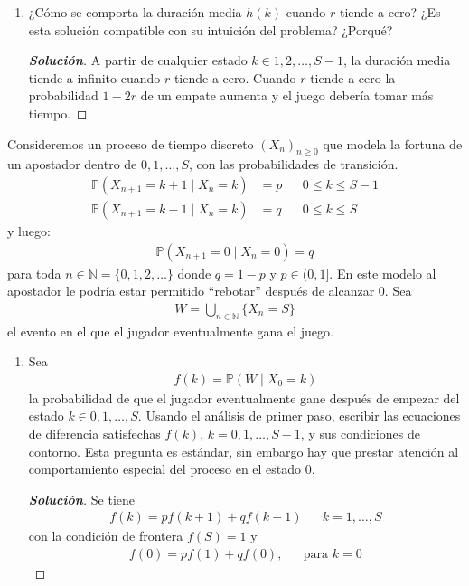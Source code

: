 \documentclass[12pt, letterpaper]{article}
\newcommand{\p}{\mathbb{P}}
\newenvironment{manualtheorem}[1]{%
  \renewcommand\themanualtheoreminner{#1}%
  \manualtheoreminner
}{\endmanualtheoreminner}
\newenvironment{solucion}
  {\renewcommand\qedsymbol{$\square$}\begin{proof}[\textbf{Solución}]}
  {\end{proof}}
\begin{document}
\begin{manualtheorem}{3.1}
\begin{enumerate}
        \item ¿Cómo se comporta la duración media $h(k)$ cuando $r$ tiende a cero? ¿Es esta solución compatible con su intuición del problema? ¿Porqué?
        \begin{solucion}
            A partir de cualquier estado $k \in {1, 2,\dots,S - 1}$, la duración media tiende a infinito cuando $r$ tiende a cero.
            Cuando $r$ tiende a cero la probabilidad $1 - 2r$ de un empate aumenta y el juego debería tomar más tiempo.
        \end{solucion}
    \end{enumerate}
    
    \end{manualtheorem}
    
    \begin{manualtheorem}{3.2}
    Consideremos un proceso de tiempo discreto $(X_n)_{n\geq0}$ que modela la fortuna de un apostador dentro de ${0, 1,\dots,S}$, con las probabilidades de transición.
    \begin{align*}
        \p(X_{n+1}=k+1 \mid X_n = k)&=p & &  0 \leq k \leq S-1\\
        \p(X_{n+1}=k-1 \mid X_n = k)&=q & &  0 \leq k \leq S
    \end{align*}
    y luego:
    \begin{align*}
        \p(X_{n+1}=0 \mid X_n = 0)=q
    \end{align*}
    para toda $n\in \mathbb{N}=\{0, 1, 2, \dots\}$ donde $q=1-p$ y $p\in(0,1]$. En este modelo al apostador le podría estar permitido ``rebotar'' después de alcanzar 0. 
    Sea
    \begin{align*}
        W=\bigcup_{n\in \mathbb{N}} \{X_{n}=S\}
    \end{align*}
    el evento en el que el jugador eventualmente gana el juego.
    \renewcommand{\labelenumi}{(\alph{enumi})}
    \begin{enumerate}
        \item Sea
        \begin{align*}
            f(k)=\p(W\mid X_0 = k)
        \end{align*}
        la probabilidad de que el jugador eventualmente gane después de empezar del estado $k\in{0, 1, \dots,S}$. Usando el análisis de primer paso, escribir las ecuaciones de diferencia satisfechas $f(k)$, $k=0, 1, \dots, S-1$, y sus condiciones de contorno. Esta pregunta es estándar, sin embargo hay que prestar atención al comportamiento especial del proceso en el estado 0.
        \begin{solucion}
            Se tiene
            \begin{align*}
                f(k)=pf(k+1)+qf(k-1) & & k=1,\dots,S
            \end{align*}
            con la condición de frontera $f(S)=1$ y
            \begin{align*}
                f(0)=pf(1)+qf(0),& & \textrm{para } k=0
            \end{align*}
        \end{solucion}
        

\end{enumerate}
\end{manualtheorem}
\end{document}
